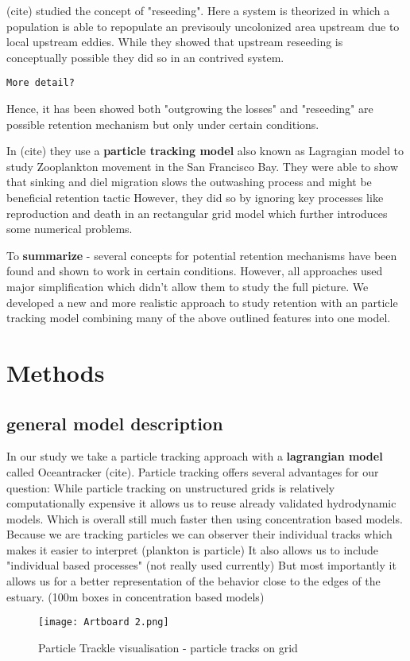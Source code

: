(cite) studied the concept of "reseeding".
Here a system is theorized in which a population is able to repopulate an previsouly uncolonized area upstream due to local upstream eddies.
While they showed that upstream reseeding is conceptually possible they did so in an contrived system.

\smallskip
\texttt{More detail?}
\smallskip

Hence, it has been showed both "outgrowing the losses" and "reseeding" are possible retention mechanism but only under certain conditions.



In (cite) they use a \textbf{particle tracking model} also known as Lagragian model to study Zooplankton movement in the San Francisco Bay.
They were able to show  that sinking and diel migration slows the outwashing process and might be beneficial retention tactic
However, they did so by ignoring key processes like reproduction and death in an rectangular grid model which further introduces some numerical problems.


To \textbf{summarize} - several concepts for potential retention mechanisms have been found and shown to work in certain conditions.
However, all approaches used major simplification which didn't allow them to study the full picture.
We developed a new and more realistic approach to study retention with an particle tracking model combining many of the above outlined features into one model.

\section*{Methods}

\subsection*{general model description}

In our study we take a particle tracking approach with a \textbf{lagrangian model} called Oceantracker (cite).
Particle tracking offers several advantages for our question:
While particle tracking on unstructured grids is relatively computationally expensive it allows us to reuse already validated hydrodynamic models. Which is overall still much faster then using concentration based models.
Because we are tracking particles we can observer their individual tracks which makes it easier to interpret (plankton is particle)
It also allows us to include "individual based processes" (not really used currently)
But most importantly it allows us for a better representation of the behavior close to the edges of the estuary. (100m boxes in concentration based models)
\begin{figure}
    \texttt{[image: Artboard 2.png]}
    \caption{Particle Trackle visualisation - particle tracks on grid}
\end{figure}

